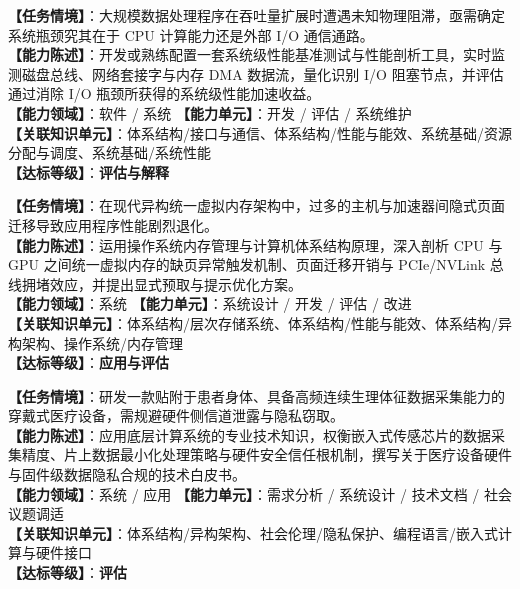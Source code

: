 \begin{taskbox}
\textbf{【任务情境】}：大规模数据处理程序在吞吐量扩展时遭遇未知物理阻滞，亟需确定系统瓶颈究其在于 CPU 计算能力还是外部 I/O 通信通路。\\
\textbf{【能力陈述】}：开发或熟练配置一套系统级性能基准测试与性能剖析工具，实时监测磁盘总线、网络套接字与内存 DMA 数据流，量化识别 I/O 阻塞节点，并评估通过消除 I/O 瓶颈所获得的系统级性能加速收益。\\
\textbf{【能力领域】}：软件 / 系统 \quad \textbf{【能力单元】}：开发 / 评估 / 系统维护\\
\textbf{【关联知识单元】}：体系结构/接口与通信、体系结构/性能与能效、系统基础/资源分配与调度、系统基础/系统性能\\
\textbf{【达标等级】}：\textbf{评估与解释}
\end{taskbox}

\begin{taskbox}
\textbf{【任务情境】}：在现代异构统一虚拟内存架构中，过多的主机与加速器间隐式页面迁移导致应用程序性能剧烈退化。\\
\textbf{【能力陈述】}：运用操作系统内存管理与计算机体系结构原理，深入剖析 CPU 与 GPU 之间统一虚拟内存的缺页异常触发机制、页面迁移开销与 PCIe/NVLink 总线拥堵效应，并提出显式预取与提示优化方案。\\
\textbf{【能力领域】}：系统 \quad \textbf{【能力单元】}：系统设计 / 开发 / 评估 / 改进\\
\textbf{【关联知识单元】}：体系结构/层次存储系统、体系结构/性能与能效、体系结构/异构架构、操作系统/内存管理\\
\textbf{【达标等级】}：\textbf{应用与评估}
\end{taskbox}

\begin{taskbox}[任务 6：连续体征监测医疗设备在硬件与系统级的数据隐私与安全影响评估]
\textbf{【任务情境】}：研发一款贴附于患者身体、具备高频连续生理体征数据采集能力的穿戴式医疗设备，需规避硬件侧信道泄露与隐私窃取。\\
\textbf{【能力陈述】}：应用底层计算系统的专业技术知识，权衡嵌入式传感芯片的数据采集精度、片上数据最小化处理策略与硬件安全信任根机制，撰写关于医疗设备硬件与固件级数据隐私合规的技术白皮书。\\
\textbf{【能力领域】}：系统 / 应用 \quad \textbf{【能力单元】}：需求分析 / 系统设计 / 技术文档 / 社会议题调适\\
\textbf{【关联知识单元】}：体系结构/异构架构、社会伦理/隐私保护、编程语言/嵌入式计算与硬件接口\\
\textbf{【达标等级】}：\textbf{评估}
\end{taskbox}

